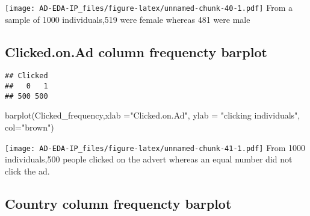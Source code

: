 \documentclass[
]{article}
\newenvironment{Shaded}{\begin{snugshade}}{\end{snugshade}}
\newcommand{\AttributeTok}[1]{\textcolor[rgb]{0.77,0.63,0.00}{#1}}
\newcommand{\FunctionTok}[1]{\textcolor[rgb]{0.00,0.00,0.00}{#1}}
\newcommand{\NormalTok}[1]{#1}
\newcommand{\OtherTok}[1]{\textcolor[rgb]{0.56,0.35,0.01}{#1}}
\newcommand{\SpecialCharTok}[1]{\textcolor[rgb]{0.00,0.00,0.00}{#1}}
\newcommand{\StringTok}[1]{\textcolor[rgb]{0.31,0.60,0.02}{#1}}
\begin{document}
\texttt{[image: AD-EDA-IP\_files/figure-latex/unnamed-chunk-40-1.pdf]}
From a sample of 1000 individuals,519 were female whereas 481 were male

\hypertarget{clicked.on.ad-column-frequencty-barplot}{%
\subsection{Clicked.on.Ad column frequencty
barplot}\label{clicked.on.ad-column-frequencty-barplot}}

\begin{Shaded}
\end{Shaded}

\begin{verbatim}
## Clicked
##   0   1 
## 500 500
\end{verbatim}

\begin{Shaded}
\begin{Highlighting}[]
\FunctionTok{barplot}\NormalTok{(Clicked\_frequency,}\AttributeTok{xlab =}\StringTok{"Clicked.on.Ad"}\NormalTok{, }\AttributeTok{ylab =} \StringTok{"clicking individuals"}\NormalTok{, }\AttributeTok{col=}\StringTok{"brown"}\NormalTok{)}
\end{Highlighting}
\end{Shaded}

\texttt{[image: AD-EDA-IP\_files/figure-latex/unnamed-chunk-41-1.pdf]}
From 1000 individuals,500 people clicked on the advert whereas an equal
number did not click the ad.

\hypertarget{country-column-frequencty-barplot}{%
\subsection{Country column frequencty
barplot}\label{country-column-frequencty-barplot}}

\begin{Shaded}
\end{Shaded}
\end{document}
